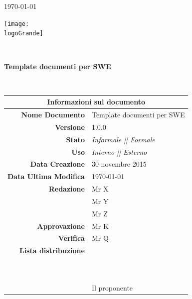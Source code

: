 \documentclass[12pt,a4paper]{article}
\title{\titoloDocumento}
\newcommand{\titoloDocumento}{Template documenti per SWE}
\newcommand{\dataCreazione}{30 novembre 2015}
\newcommand{\versione}{1.0.0}
\newcommand{\stato}{Informale || Formale}
\begin{document}
\begin{titlepage}
\begin{center}
\today \\
\vspace{1cm}
\begin{Huge}
\textbf{\nomeTeam}
\end{Huge}
\vspace{1cm}
\texttt{[image: \\logoGrande]}
\vspace{1cm}

\HRule \\[0.4cm]
\begin{Huge}
{\huge \bfseries \titoloDocumento}\\[0.4cm]
\end{Huge}
\HRule \\[1cm]
\vfill

\begin{table}[h]
\begin{center}
\begin{tabular}{r | l}
\multicolumn{2}{c}{\textbf{Informazioni sul documento}}\\
\midrule
\textbf{Nome Documento}	&	\titoloDocumento	\\
\textbf{Versione}	&	\versione	\\
\textbf{Stato}	&	\emph{\stato}	\\
\textbf{Uso}	&	\emph{Interno || Esterno}	\\
\textbf{Data Creazione}	&	\dataCreazione	\\
\textbf{Data Ultima Modifica}	&	\today	\\
\textbf{Redazione}	&	Mr X	\\
\ 	&	Mr Y	\\
\ 	&	Mr Z	\\
\textbf{Approvazione}	&	Mr K	\\
\textbf{Verifica}	&	Mr Q	\\
\textbf{Lista distribuzione}	&	\nomeTeam	\\
\ 	&	\Vardanega	\\
\ 	&	\Cardin	\\
\ 	&	Il proponente \Zucchetti	\\

\end{tabular}
\end{center}
\end{table}

\end{center}
\end{titlepage}
\newpage
\end{document}
